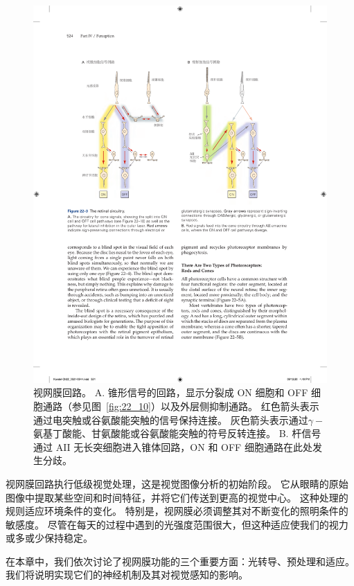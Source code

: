 \begin{figure}[htbp]
	\centering
	\includegraphics[width=1.0\linewidth]{chap22/fig_22_3}
	\caption{视网膜回路。
		A. 锥形信号的回路，显示分裂成 ON 细胞和 OFF 细胞通路（参见图~\ref{fig:22_10}）以及外层侧抑制通路。
		红色箭头表示通过电突触或谷氨酸能突触的信号保持连接。
		灰色箭头表示通过$\gamma-$氨基丁酸能、甘氨酸能或谷氨酸能突触的符号反转连接。
		B. 杆信号通过 AII 无长突细胞进入锥体回路，ON 和 OFF 细胞通路在此处发生分歧。}
	\label{fig:22_3}
\end{figure}


视网膜回路执行低级视觉处理，这是视觉图像分析的初始阶段。
它从眼睛的原始图像中提取某些空间和时间特征，并将它们传送到更高的视觉中心。
这种处理的规则适应环境条件的变化。
特别是，视网膜必须调整其对不断变化的照明条件的敏感度。
尽管在每天的过程中遇到的光强度范围很大，但这种适应使我们的视力或多或少保持稳定。


在本章中，我们依次讨论了视网膜功能的三个重要方面：光转导、预处理和适应。
我们将说明实现它们的神经机制及其对视觉感知的影响。




